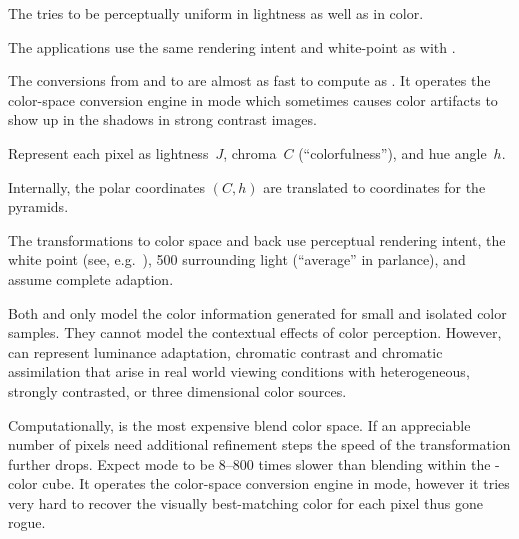 \begin{description}
  The  tries to be perceptually uniform in lightness as well as in color.

  The applications use the same rendering intent and white-point as with .

  The conversions from and to  are almost as fast to compute as
  .  It operates the  color-space conversion engine in
   mode which sometimes causes color artifacts to
  show up in the shadows in strong contrast images.

\item[\urlmark{\wikipediaciecam}{\acronym{CIECAM02}}]\itemend\urltext
  Represent each pixel as lightness~$J$, chroma~$C$ (``colorfulness''), and hue
  angle~$h$.

  \begin{geeknote}
    Internally, the polar coordinates $(C, h)$ are translated to 
    coordinates for the pyramids.
  \end{geeknote}

  The transformations to  color space and back use perceptual rendering
  intent, the  white point (see, e.g.\ ), 500 surrounding light (``average'' in  parlance),
  and assume complete adaption.

  Both  and  only model the color information generated for
  small and isolated color samples.  They cannot model the contextual effects of color
  perception.  However,  can represent luminance adaptation, chromatic
  contrast and chromatic assimilation that arise in real world viewing conditions with
  heterogeneous, strongly contrasted, or three dimensional color sources.

  Computationally,  is the most expensive blend color space.  If an
  appreciable number of pixels need additional refinement steps the speed of the transformation
  further drops.  Expect  mode to be 8--800 times slower than blending within
  the -color cube.  It operates the  color-space conversion
  engine in  mode, however it tries very hard to
  recover the visually best-matching color for each pixel thus gone rogue.
\end{description}

